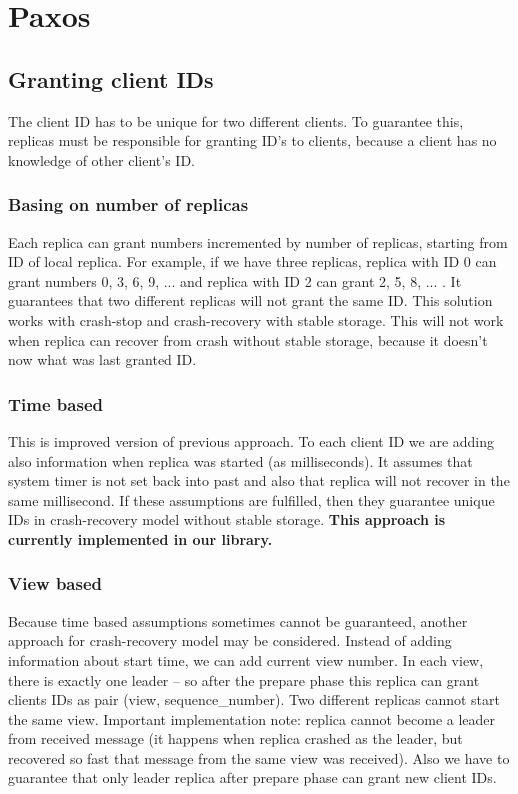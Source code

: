 \chapter{Paxos}

\section{Granting client IDs}
The client ID has to be unique for two different clients. To guarantee this, replicas must be responsible for granting ID's to clients, because a client has no knowledge of other client's ID.
\subsection{Basing on number of replicas}
Each replica can grant numbers incremented by number of replicas, starting from ID of local replica. For example, if we have three replicas, replica with ID 0 can grant numbers 0, 3, 6, 9, ... and replica with ID 2 can grant 2, 5, 8, ... . It guarantees that two different replicas will not grant the same ID. This solution works with crash-stop and crash-recovery with stable storage. This will not work when replica can recover from crash without stable storage, because it doesn't now what was last granted ID.
\subsection{Time based}
This is improved version of previous approach. To each client ID we are adding also information when replica was started (as milliseconds). It assumes that system timer is not set back into past and also that replica will not recover in the same millisecond. If these assumptions are fulfilled, then they guarantee unique IDs in crash-recovery model without stable storage. \textbf{This approach is currently implemented in our library.}
\subsection{View based}
Because time based assumptions sometimes cannot be guaranteed, another approach for crash-recovery model may be considered. Instead of adding information about start time, we can add current view number. In each view, there is exactly one leader -- so after the prepare phase this replica can grant clients IDs as pair (view, sequence\_number). Two different replicas cannot start the same view. Important implementation note: replica cannot become a leader from received message (it happens when replica crashed as the leader, but recovered so fast that message from the same view was received). Also we have to guarantee that only leader replica after prepare phase can grant new client IDs.
